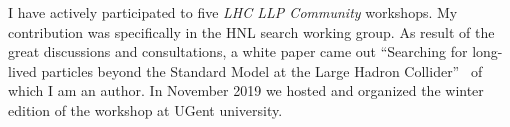 I have actively participated to five \emph{LHC LLP Community}
workshops. My contribution was specifically in the HNL search working
group. As result of the great discussions and consultations, a white
paper came out ``Searching for long-lived particles beyond the
Standard Model at the Large Hadron Collider''~\cite{Alimena_2020} of
which I am an author. In November 2019 we hosted and organized the winter edition
of the workshop at UGent university.